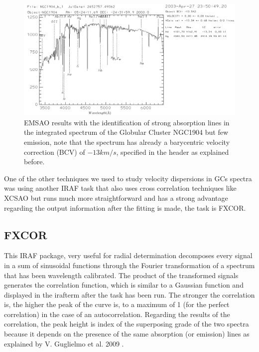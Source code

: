 \begin{figure}[H]
\centering
\includegraphics[width=13cm]{images/emsao.png}
\caption[EMSAO results with the identification of lines]{EMSAO results with the identification of strong absorption lines in the integrated spectrum of the Globular Cluster NGC1904 but few emission, note that the spectrum has already a barycentric velocity correction (BCV) of $-13km/s$, specified in the header as explained before.}
\end{figure}

One of the other techniques we used to study velocity dispersions in GCs spectra was using another IRAF task that also uses cross correlation techniques like XCSAO but runs much more straightforward and has a strong advantage regarding the output information after the fitting is made, the task is FXCOR. 

\subsection{FXCOR}

This IRAF package, very useful for radial determination decomposes every signal in a sum of sinusoidal functions through the Fourier transformation of a spectrum that has been wavelength calibrated. The product of the transformed signals generates the correlation function, which is similar to a Gaussian function and displayed in the irafterm after the task has been run. The stronger the correlation is, the higher the peak of the curve is, to a maximum of 1 (for the perfect correlation) in the case of an autocorrelation. Regarding the results of the correlation, the peak height is index of the superposing grade of the two spectra because it depends on the presence of the same absorption (or emission) lines as explained by V. Guglielmo et al. 2009 \cite{16}. 

